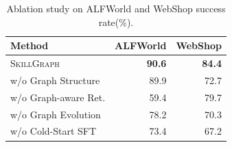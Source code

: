 \begin{table}
    \vspace{-30pt}
    \caption{Ablation study on ALFWorld and WebShop success rate(\%).}
    \label{tab:ablation}
    \centering
    \small
    \begin{tabular}{lrr}
    \toprule
    Method & ALFWorld & WebShop \\
    \midrule
    \textsc{SkillGraph} & \textbf{90.6} & \textbf{84.4} \\
    \midrule
    w/o Graph Structure  & 89.9 & 72.7 \\
    w/o Graph-aware Ret. &  59.4    &  79.7  \\
    w/o Graph Evolution &  78.2  &  70.3 \\
    w/o Cold-Start SFT   &  73.4  &  67.2  \\
    \bottomrule
    \end{tabular}
    \vspace{-20pt}
\end{table}